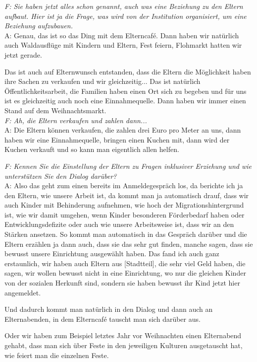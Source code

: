 \begin{linenumbers*}
\emph{F:  Sie haben jetzt alles schon genannt, auch was eine Beziehung zu den Eltern aufbaut.  
Hier ist ja die Frage, was wird von der Institution organisiert, um eine Beziehung aufzubauen.}\\
A:  Genau, das ist so das Ding mit dem Elterncafé. Dann haben wir natürlich auch Waldausflüge mit Kindern und Eltern, Fest feiern, Flohmarkt hatten wir jetzt gerade.  

Das ist auch auf Elternwunsch entstanden, dass die Eltern die Möglichkeit haben ihre Sachen zu verkaufen und wir gleichzeitig... Das ist natürlich Öffentlichkeitsarbeit, die Familien haben einen Ort sich zu begeben und für uns ist es gleichzeitig auch noch eine Einnahmequelle. Dann haben wir immer einen Stand auf dem Weihnachtsmarkt.\\
\emph{F: Ah, die Eltern verkaufen und zahlen dann...}\\
A:  Die Eltern können verkaufen, die zahlen drei Euro pro Meter an uns, dann haben wir eine Einnahmequelle, bringen einen Kuchen mit, dann wird der Kuchen verkauft und so kann man eigentlich allen helfen.  

\emph{F: Kennen Sie die Einstellung der Eltern zu Fragen inklusiver Erziehung und wie unterstützen Sie den Dialog darüber?}\\
A: Also das geht zum einen bereits im Anmeldegespräch los, da berichte ich ja den Eltern, wie unsere Arbeit ist, da kommt man ja automatisch drauf, dass wir auch Kinder mit Behinderung aufnehmen, wie hoch der Migrationshintergrund ist, wie wir damit umgehen, wenn Kinder besonderen Förderbedarf haben oder Entwicklungsdefizite oder auch wie unsere Arbeitsweise ist, dass wir an den Stärken ansetzen. So kommt man automatisch in das Gespräch darüber und die Eltern erzählen ja dann auch, dass sie das sehr gut finden, 
manche sagen, dass sie bewusst unsere Einrichtung ausgewählt haben. 
Das fand ich auch ganz erstaunlich, wir haben auch Eltern aus [Stadtteil], die sehr viel Geld haben, die sagen, wir wollen bewusst nicht in eine Einrichtung, wo nur die gleichen Kinder von der sozialen Herkunft sind, sondern sie haben bewusst ihr Kind jetzt hier angemeldet.  

Und dadurch kommt man natürlich in den Dialog und dann auch an Elternabenden, in dem Elterncafé tauscht man sich darüber aus. 

Oder wir haben zum Beispiel letztes Jahr vor Weihnachten einen Elternabend gehabt, dass man sich über Feste in den jeweiligen Kulturen ausgetauscht hat, wie feiert man die einzelnen Feste.  


\end{linenumbers*}
